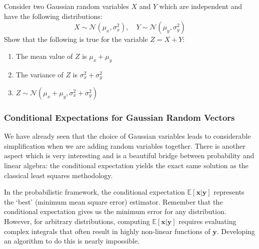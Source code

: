 \begin{exercise}
Consider two Gaussian random variables $X$ and $Y$ which are independent and have the following distributions:
$$X\sim\mathcal{N}(\mu_x,\sigma_x^2),\quad Y\sim\mathcal{N}(\mu_y,
\sigma_y^2)$$
Show that the following is true for the variable $Z=X+Y$:
\begin{enumerate}
    \item The mean value of $Z$ is $\mu_x+\mu_y$
    \item The variance of $Z$ is $\sigma_x^2+\sigma_y^2$
    \item $Z\sim\mathcal{N}(\mu_x+\mu_y,\sigma_x^2+\sigma_y^2)$
\end{enumerate}
\end{exercise}
\subsubsection{Conditional Expectations for Gaussian Random Vectors}
We have already seen that the choice of Gaussian variables leads to considerable simplification when we are adding random variables together. There is another aspect which is very interesting and is a beautiful bridge between probability and linear algebra: the conditional expectation yields the exact same solution as the classical least squares methodology.

In the probabilistic framework, the conditional expectation $\mathbb{E}[\bm{x} | \bm{y}]$ represents the `best' (minimum mean square error) estimator. Remember that the conditional expectation gives us the minimum error for any distribution. However, for arbitrary distributions, computing $\mathbb{E}[\bm{x} | \bm{y}]$ requires evaluating complex integrals that often result in highly non-linear functions of $\bm{y}$. Developing an algorithm to do this is nearly impossible.


